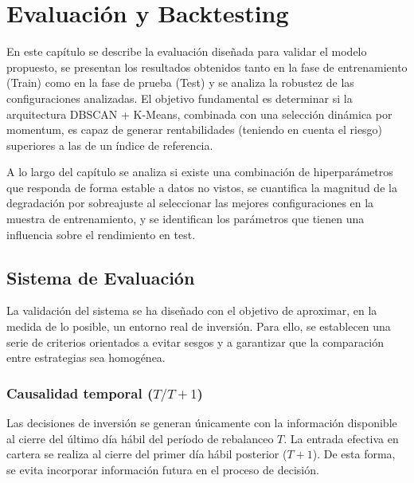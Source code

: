 
\section{Evaluación y Backtesting}

En este capítulo se describe la evaluación
diseñada para validar el modelo propuesto, se presentan
los resultados obtenidos tanto en la fase de
entrenamiento (Train) como en la fase de prueba
(Test) y se analiza la robustez de las
configuraciones analizadas. El objetivo fundamental es
determinar si la arquitectura DBSCAN + K-Means,
combinada con una selección dinámica por momentum, es capaz de
generar rentabilidades (teniendo en cuenta el riesgo) superiores a las de
un índice de referencia.

A lo largo del capítulo se analiza si existe una combinación de hiperparámetros que responda de forma estable a datos no vistos, se cuantifica la magnitud de la degradación por sobreajuste al seleccionar las mejores configuraciones en la muestra de entrenamiento, y se identifican los parámetros que tienen una influencia sobre el rendimiento en test.


\subsection{Sistema de Evaluación}

La validación del sistema se ha diseñado con el objetivo de
aproximar, en la medida de lo posible, un entorno real de
inversión. Para ello, se establecen una serie de criterios orientados a evitar sesgos y a garantizar que la
comparación entre estrategias sea homogénea.

\subsubsection{Causalidad temporal ($T/T+1$)}

Las decisiones de inversión se generan únicamente con la
información disponible al cierre del último día hábil del período
de rebalanceo $T$. La entrada efectiva en cartera se realiza al
cierre del primer día hábil posterior ($T+1$). De esta forma,
se evita incorporar información futura en el proceso de decisión.

